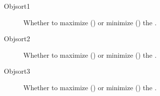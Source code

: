 \documentclass[letterpaper,10pt,english]{sphinxmanual}
\begin{document}
\label{\detokenize{inputs/agents:objsort1}}\begin{description}
\item[{Objsort1}] \leavevmode
Whether to maximize () or minimize () the {\hyperref[\detokenize{inputs/agents:objective1}]{}}.

\item[{Objsort2}] \leavevmode
Whether to maximize () or minimize () the {\hyperref[\detokenize{inputs/agents:objective2}]{}}.

\item[{Objsort3}] \leavevmode
Whether to maximize () or minimize () the {\hyperref[\detokenize{inputs/agents:objective3}]{}}.

\end{description}
\end{document}
